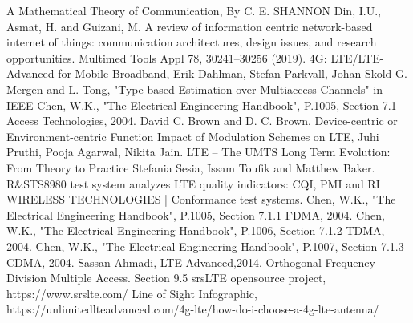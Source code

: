 \begin{thebibliography}{9}
A Mathematical Theory of Communication, By C. E. SHANNON
Din, I.U., Asmat, H. and Guizani, M. A review of information centric network-based internet of things: communication architectures, design issues, and research opportunities. Multimed Tools Appl 78, 30241–30256 (2019). 
4G: LTE/LTE-Advanced for Mobile Broadband, Erik Dahlman, Stefan Parkvall, Johan Skold
G. Mergen and L. Tong, "Type based Estimation over Multiaccess Channels" in IEEE 
Chen, W.K., "The Electrical Engineering Handbook", P.1005, Section 7.1 Access Technologies, 2004.
David C. Brown and D. C. Brown, Device-centric or Environment-centric Function
Impact of Modulation Schemes on LTE, Juhi Pruthi, Pooja Agarwal, Nikita Jain.
LTE – The UMTS Long Term Evolution: From Theory to Practice Stefania Sesia, Issam Toufik and Matthew Baker.
R\&STS8980 test system analyzes LTE quality indicators: CQI, PMI and RI
WIRELESS TECHNOLOGIES | Conformance test systems. 
Chen, W.K., "The Electrical Engineering Handbook", P.1005, Section 7.1.1 FDMA, 2004. 
Chen, W.K., "The Electrical Engineering Handbook", P.1006, Section 7.1.2 TDMA, 2004.
Chen, W.K., "The Electrical Engineering Handbook", P.1007, Section 7.1.3 CDMA, 2004.
Sassan Ahmadi, LTE-Advanced,2014. Orthogonal Frequency Division Multiple Access. Section 9.5
srsLTE opensource project, https://www.srslte.com/ 
Line of Sight Infographic, https://unlimitedlteadvanced.com/4g-lte/how-do-i-choose-a-4g-lte-antenna/
\end{thebibliography}